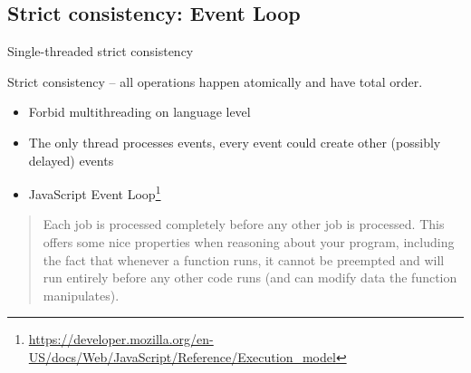 \subsection{Strict consistency: Event Loop}
\showTOCSub

\begin{frame}[fragile, t]{Single-threaded strict consistency}

Strict consistency -- all operations happen atomically and have total order.

\begin{itemize}
  \pause \item Forbid multithreading on language level
  \pause \item The only thread processes events, every event could create other (possibly delayed) events
  \pause \item JavaScript Event Loop\footnote<4->{\tiny\url{https://developer.mozilla.org/en-US/docs/Web/JavaScript/Reference/Execution_model}}
\end{itemize}

\pause
\begin{quote}
Each job is processed completely before any other job is processed. This offers some nice properties when reasoning about your program, including the fact that whenever a function runs, it cannot be  preempted and will run entirely before any other code runs (and can modify data the function manipulates). 
\end{quote}

\end{frame}


